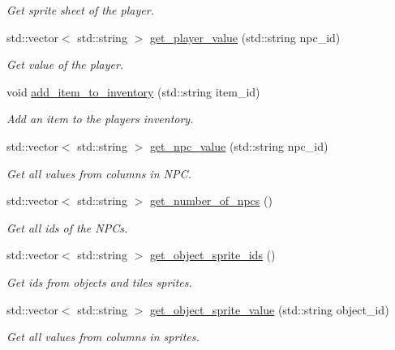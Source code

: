 \begin{DoxyCompactItemize}
\begin{DoxyCompactList}\small\item\em Get sprite sheet of the player. \end{DoxyCompactList}\item 
std\+::vector$<$ std\+::string $>$ \hyperlink{classsql_a251f53bb3d5d98f821713a42212276e9}{get\+\_\+player\+\_\+value} (std\+::string npc\+\_\+id)
\begin{DoxyCompactList}\small\item\em Get value of the player. \end{DoxyCompactList}\item 
void \hyperlink{classsql_af0e753f3af81ff1ff7f7582dcea4b0ed}{add\+\_\+item\+\_\+to\+\_\+inventory} (std\+::string item\+\_\+id)
\begin{DoxyCompactList}\small\item\em Add an item to the players inventory. \end{DoxyCompactList}\item 
std\+::vector$<$ std\+::string $>$ \hyperlink{classsql_af04403a0cab4ee13a6f70b396e5b3a20}{get\+\_\+npc\+\_\+value} (std\+::string npc\+\_\+id)
\begin{DoxyCompactList}\small\item\em Get all values from columns in N\+PC. \end{DoxyCompactList}\item 
std\+::vector$<$ std\+::string $>$ \hyperlink{classsql_ae854372bac3fc5e681287e3cbf5b03de}{get\+\_\+number\+\_\+of\+\_\+npcs} ()
\begin{DoxyCompactList}\small\item\em Get all id\textquotesingle{}s of the N\+PC\textquotesingle{}s. \end{DoxyCompactList}\item 
std\+::vector$<$ std\+::string $>$ \hyperlink{classsql_a0ea1aa772cb693be29da61c6cadffd86}{get\+\_\+object\+\_\+sprite\+\_\+ids} ()
\begin{DoxyCompactList}\small\item\em Get id\textquotesingle{}s from objects and tiles sprites. \end{DoxyCompactList}\item 
std\+::vector$<$ std\+::string $>$ \hyperlink{classsql_a2466fe5b0ec24e98190ee5763a4a69d1}{get\+\_\+object\+\_\+sprite\+\_\+value} (std\+::string object\+\_\+id)
\begin{DoxyCompactList}\small\item\em Get all values from columns in sprites. \end{DoxyCompactList}\item 

\end{DoxyCompactItemize}
